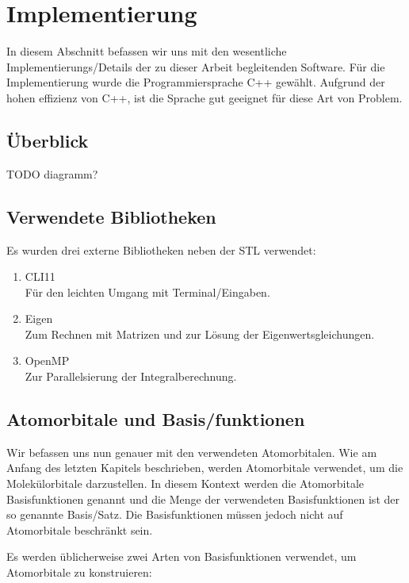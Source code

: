 \section{Implementierung}
In diesem Abschnitt befassen wir uns mit den wesentliche Implementierungs\-/Details
der zu dieser Arbeit begleitenden Software. Für die Implementierung wurde
die Programmiersprache C++ gewählt. Aufgrund der hohen effizienz von C++, ist die Sprache
gut geeignet für diese Art von Problem.

\subsection{Überblick}
 TODO diagramm?
\subsection{Verwendete Bibliotheken}
Es wurden drei externe Bibliotheken neben der STL verwendet:
\begin{enumerate}
    \item CLI11 \cite{cl11}\\
    Für den leichten Umgang mit Terminal\-/Eingaben.
    \item Eigen \cite{eigen}\\
    Zum Rechnen mit Matrizen und zur Lösung der Eigenwertsgleichungen.
    \item OpenMP \cite{omp}\\
    Zur Parallelsierung der Integralberechnung.
\end{enumerate}

\subsection{Atomorbitale und Basis\-/funktionen}\label{basis-functions-section}
Wir befassen uns nun genauer mit den verwendeten Atomorbitalen.
Wie am Anfang des letzten Kapitels beschrieben, werden Atomorbitale verwendet,
um die Molekülorbitale darzustellen. In diesem Kontext werden die Atomorbitale
Basisfunktionen genannt und die Menge der verwendeten Basisfunktionen
ist der so genannte Basis\-/Satz.
Die Basisfunktionen müssen jedoch nicht auf Atomorbitale beschränkt sein.
\cite[Ab. 5.3.1]{lewars_2016}

Es werden üblicherweise zwei Arten von Basisfunktionen verwendet,
um Atomorbitale zu konstruieren:

